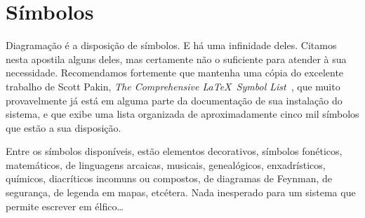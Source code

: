 \section{Símbolos}

Diagramação é a disposição de símbolos. E há uma infinidade
deles. Citamos nesta apostila alguns deles, mas certamente não o
suficiente para atender à sua necessidade. Recomendamos fortemente que
mantenha uma cópia do excelente trabalho de Scott Pakin, \emph{The
  Comprehensive  \LaTeX\ Symbol
  List}~\cite{article:comprehensive-symbols}, que muito provavelmente
já está em alguma parte da documentação de sua instalação do sistema,
e que exibe uma lista organizada de aproximadamente cinco mil símbolos
que estão a sua disposição. 

Entre os símbolos disponíveis, estão elementos decorativos, símbolos
fonéticos, matemáticos, de linguagens arcaicas, musicais,
genealógicos, enxadrísticos, químicos, diacríticos incomuns ou
compostos, de diagramas de Feynman, de segurança, de legenda em mapas,
etcétera. Nada inesperado para um sistema que permite escrever em
élfico\ldots

